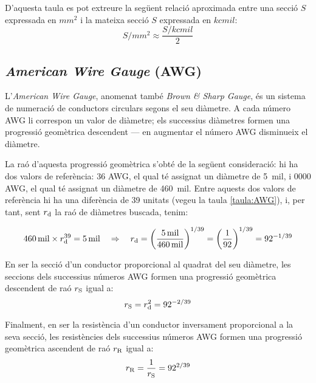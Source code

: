 D'aquesta taula es pot extreure la següent relació aproximada entre una secció $S$ expressada en $\unit{mm^2}$ i la mateixa secció $S$ expressada en $\unit{kcmil}$:
\begin{equation}
  S/{\scriptstyle\unit{mm^2}} \approx \frac{ S/{\scriptstyle\unit{kcmil}}}{2}
\end{equation}



\subsection{\textit{American Wire Gauge} (AWG)}\label{sec:awg}

L'\textit{American Wire Gauge}, anomenat també \textit{Brown \& Sharp Gauge}, és un sistema de numeració de conductors circulars segons el seu diàmetre. A cada número AWG li correspon un valor de diàmetre; els successius diàmetres formen una progressió geomètrica descendent --- en augmentar el número AWG disminueix el diàmetre.

La raó d'aquesta progressió geomètrica s'obté de la següent consideració: hi ha dos valors de referència: 36 AWG, el qual té assignat un diàmetre de \qty{5}{mil}, i 0000 AWG, el qual té assignat un diàmetre de \qty{460}{mil}. Entre aquests dos valors de referència hi ha una diferència de 39 unitats (vegeu la taula \vref{taula:AWG}), i, per tant, sent $r_\mathrm{d}$ la raó de diàmetres buscada, tenim:

\begin{equation}
   \qty{460}{mil} \times r_\mathrm{d}^{39} = \qty{5}{mil} \quad \Rightarrow \quad r_\mathrm{d} = \left( \frac{\qty{5}{mil}}{\qty{460}{mil}} \right)^{1/39} = \left( \frac{1}{92} \right)^{1/39} = 92^{-1/39}
\end{equation}

En ser la secció d'un conductor proporcional al quadrat del seu diàmetre, les seccions dels successius números AWG formen una progressió geomètrica  descendent de raó $r_\mathrm{S}$ igual a: \begin{equation}
   r_\mathrm{S} = r_\mathrm{d}^2 = 92^{-2/39}
\end{equation}

Finalment, en ser la resistència d'un conductor inversament proporcional a la seva secció, les resistències dels successius números AWG formen una progressió geomètrica ascendent de raó $r_\mathrm{R}$ igual a:
\begin{equation}
   r_\mathrm{R} = \frac{1}{r_\mathrm{S}} = 92^{2/39}
\end{equation}

